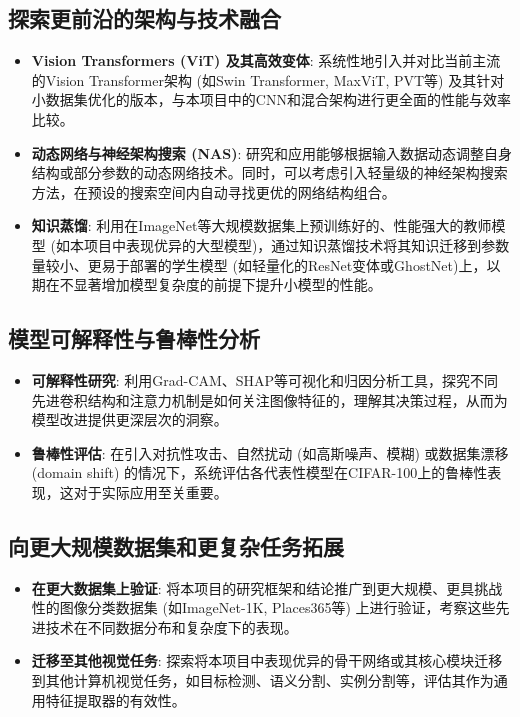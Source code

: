 \documentclass[a4paper]{article}
\begin{document}
\begin{description}
\subsection{探索更前沿的架构与技术融合}
\begin{itemize}
    \item \textbf{Vision Transformers (ViT) 及其高效变体}: 系统性地引入并对比当前主流的Vision Transformer架构 (如Swin Transformer, MaxViT, PVT等) 及其针对小数据集优化的版本，与本项目中的CNN和混合架构进行更全面的性能与效率比较。
    \item \textbf{动态网络与神经架构搜索 (NAS)}: 研究和应用能够根据输入数据动态调整自身结构或部分参数的动态网络技术。同时，可以考虑引入轻量级的神经架构搜索方法，在预设的搜索空间内自动寻找更优的网络结构组合。
    \item \textbf{知识蒸馏}: 利用在ImageNet等大规模数据集上预训练好的、性能强大的教师模型 (如本项目中表现优异的大型模型)，通过知识蒸馏技术将其知识迁移到参数量较小、更易于部署的学生模型 (如轻量化的ResNet变体或GhostNet)上，以期在不显著增加模型复杂度的前提下提升小模型的性能。
\end{itemize}

\subsection{模型可解释性与鲁棒性分析}
\begin{itemize}
    \item \textbf{可解释性研究}: 利用Grad-CAM、SHAP等可视化和归因分析工具，探究不同先进卷积结构和注意力机制是如何关注图像特征的，理解其决策过程，从而为模型改进提供更深层次的洞察。
    \item \textbf{鲁棒性评估}: 在引入对抗性攻击、自然扰动 (如高斯噪声、模糊) 或数据集漂移 (domain shift) 的情况下，系统评估各代表性模型在CIFAR-100上的鲁棒性表现，这对于实际应用至关重要。
\end{itemize}

\subsection{向更大规模数据集和更复杂任务拓展}
\begin{itemize}
    \item \textbf{在更大数据集上验证}: 将本项目的研究框架和结论推广到更大规模、更具挑战性的图像分类数据集 (如ImageNet-1K, Places365等) 上进行验证，考察这些先进技术在不同数据分布和复杂度下的表现。
    \item \textbf{迁移至其他视觉任务}: 探索将本项目中表现优异的骨干网络或其核心模块迁移到其他计算机视觉任务，如目标检测、语义分割、实例分割等，评估其作为通用特征提取器的有效性。
\end{itemize}


\end{description}
\end{document}
